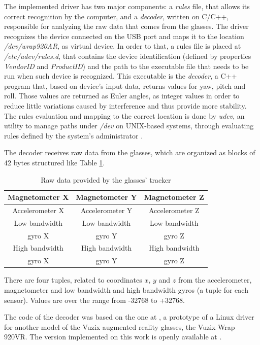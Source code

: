\documentclass[msc, a4paper, classic, en]{ufbathesis}
\begin{document}
The implemented driver has two major components: a \textit{rules} file, that allows its correct recognition by the computer, and a \textit{decoder}, written on C/C++, responsible for analyzing the raw data that comes from the glasses. The driver recognizes the device connected on the USB port and maps it to the location \textit{/dev/wrap920AR}, as virtual device. In order to that, a rules file is placed at \textit{/etc/udev/rules.d}, that contains the device identification (defined by properties \textit{VendorID} and \textit{ProductID}) and the path to the executable file that needs to be run when such device is recognized. This executable is the \textit{decoder}, a C++ program that, based on device's input data, returns values for yaw, pitch and roll. Those values are returned as Euler angles, as integer values in order to reduce little variations caused by interference and thus provide more stability. The rules evaluation and mapping to the correct location is done by \textit{udev}, an utility to manage paths under \textit{/dev} on UNIX-based systems, through evaluating rules defined by the system's administrator \cite{udev}.

The decoder receives raw data from the glasses, which are organized as blocks of 42 bytes structured like Table \ref{tab:glassesdata}.

\begin{table}
\caption{Raw data provided by the glasses' tracker}
\label{tab:glassesdata}
\centering
\begin{tabular}{|c|c|c|}
\hline
Magnetometer X                & Magnetometer Y                & Magnetometer Z\\
\hline
Accelerometer X                & Accelerometer Y                & Accelerometer Z\\
\hline
Low bandwidth & Low bandwidth & Low bandwidth \\
gyro X & gyro Y & gyro Z \\
\hline
High bandwidth & High bandwidth & High bandwidth \\
gyro X & gyro Y & gyro Z \\
\hline
\end{tabular}
\end{table}

There are four tuples, related to coordinates $x$, $y$ and $z$ from the accelerometer, magnetometer and low bandwidth and high bandwidth gyros (a tuple for each sensor). Values are over the range from -32768 to +32768.

The code of the decoder was based on the one at \cite{vuzixdriver}, a prototype of a Linux driver for another model of the Vuzix augmented reality glasses, the Vuzix Wrap 920VR. The version implemented on this work is openly available at \cite{masterproject}.
\end{document}
